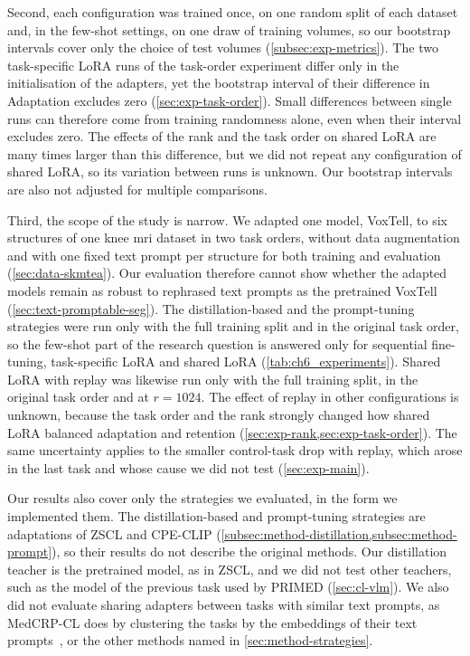 Second, each configuration was trained once, on one random split of each dataset and, in the few-shot settings, on one draw of training volumes, so our bootstrap intervals cover only the choice of test volumes (\cref{subsec:exp-metrics}).
The two task-specific LoRA runs of the task-order experiment differ only in the initialisation of the adapters, yet the bootstrap interval of their difference in Adaptation excludes zero (\cref{sec:exp-task-order}).
Small differences between single runs can therefore come from training randomness alone, even when their interval excludes zero.
The effects of the rank and the task order on shared LoRA are many times larger than this difference, but we did not repeat any configuration of shared LoRA, so its variation between runs is unknown.
Our bootstrap intervals are also not adjusted for multiple comparisons.

Third, the scope of the study is narrow.
We adapted one model, VoxTell, to six structures of one knee \gls{mri} dataset in two task orders, without data augmentation and with one fixed text prompt per structure for both training and evaluation (\cref{sec:data-skmtea}).
Our evaluation therefore cannot show whether the adapted models remain as robust to rephrased text prompts as the pretrained VoxTell (\cref{sec:text-promptable-seg}).
The distillation-based and the prompt-tuning strategies were run only with the full training split and in the original task order, so the few-shot part of the research question is answered only for sequential fine-tuning, task-specific LoRA and shared LoRA (\cref{tab:ch6_experiments}).
Shared LoRA with replay was likewise run only with the full training split, in the original task order and at $r = 1024$.
The effect of replay in other configurations is unknown, because the task order and the rank strongly changed how shared LoRA balanced adaptation and retention (\cref{sec:exp-rank,sec:exp-task-order}).
The same uncertainty applies to the smaller control-task drop with replay, which arose in the last task and whose cause we did not test (\cref{sec:exp-main}).

Our results also cover only the strategies we evaluated, in the form we implemented them.
The distillation-based and prompt-tuning strategies are adaptations of ZSCL and CPE-CLIP (\cref{subsec:method-distillation,subsec:method-prompt}), so their results do not describe the original methods.
Our distillation teacher is the pretrained model, as in ZSCL, and we did not test other teachers, such as the model of the previous task used by PRIMED (\cref{sec:cl-vlm}).
We also did not evaluate sharing adapters between tasks with similar text prompts, as MedCRP-CL does by clustering the tasks by the embeddings of their text prompts~\cite{gao2026medcrpcl}, or the other methods named in \cref{sec:method-strategies}.

